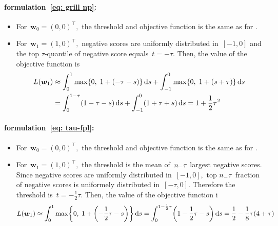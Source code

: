 \paragraph*{\GrillNP formulation~\eqref{eq: grill np}:}
\begin{itemize}
  \item For~$\bm{w}_0 = (0,0)^{\top},$ the threshold and objective function is the same as for \Grill.
  \item For~$\bm{w}_1 = (1,0)^{\top},$ negative scores are uniformly distributed in~$[-1,0]$ and the top $\tau$-quantile of negative score equals~$t = -\tau.$ Then, the value of the objective function is
  \begin{align*}
    L(\bm{w}_1)
      & \approx \int_{0}^{1} \max\Brac[c]{0, \; 1 + \Brac{-\tau - s}} \dd{s} + \int_{-1}^{0} \max\Brac[c]{0, \; 1 + \Brac{s + \tau}} \dd{s} \\
      & = \int_{0}^{1-\tau} \Brac{1 - \tau - s} \dd{s} + \int_{-1}^{0} \Brac{1 + \tau + s} \dd{s}
      = 1 + \frac{1}{2}\tau^2
  \end{align*}
\end{itemize}

\paragraph*{\tauFPL formulation~\eqref{eq: tau-fpl}:}
\begin{itemize}
  \item For~$\bm{w}_0 = (0,0)^{\top},$ the threshold and objective function is the same as for \TopPushK.
  \item For~$\bm{w}_1 = (1,0)^{\top},$ the threshold is the mean of~$n_{-} \tau$ largest negative scores. Since negative scores are uniformly distributed in~$[-1, 0],$ top $n_{-} \tau$ fraction of negative scores is uniformely distributed in~$[-\tau, 0].$ Therefore the threshold is~$t = -\frac{1}{2}\tau.$ Then, the value of the objective function i
  \begin{equation*}
    L(\bm{w}_1)
      \approx \int_{0}^{1} \max\Brac[c]{0, \; 1 + \Brac{- \frac{1}{2}\tau - s}} \dd{s}
      = \int_{0}^{1 - \frac{1}{2}\tau} \Brac{1 - \frac{1}{2}\tau - s} \dd{s}
      = \frac{1}{2} - \frac{1}{8} \tau \Brac{4 + \tau}
  \end{equation*}
\end{itemize}

